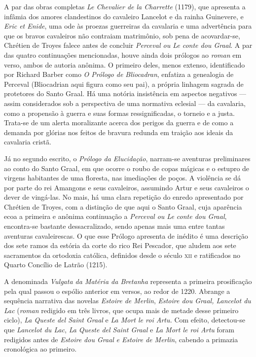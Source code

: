 A par das obras completas \textit{Le Chevalier de la Charrette} (1179),
que apresenta a infâmia dos amores clandestinos do cavaleiro Lancelot e
da rainha Guinevere, e \textit{Eric et Enide}, uma ode às proezas
guerreiras da cavalaria e uma advertência para que os bravos cavaleiros
não contraiam matrimônio, sob pena de acovardar-se, Chrétien de Troyes
falece antes de concluir \textit{Perceval ou Le conte dou Graal}. A par
das quatro continuações mencionadas, houve ainda dois prólogos ao
\textit{roman} em verso, ambos de autoria anônima. O primeiro deles,
menos extenso, identificado por Richard Barber como \textit{O Prólogo
de Bliocadran}, enfatiza a genealogia de Perceval (Bliocadrian aqui
figura como seu pai), a própria linhagem sagrada de protetores do Santo
Graal. Há uma notória insistência em aspectos negativos --- assim
considerados sob a perspectiva de uma normativa eclesial --- da
cavalaria, como a propensão à guerra e suas formas ressignificadas, o
torneio e a justa. Trata-se de um alerta moralizante acerca dos perigos
da guerra e de como a demanda por glórias nos feitos de bravura redunda
em traição aos ideais da cavalaria cristã.

Já no segundo escrito, o \textit{Prólogo da Elucidação}, narram-se
aventuras preliminares ao conto do Santo Graal, em que ocorre o roubo
de copas mágicas e o estupro de virgens habitantes de uma floresta, nas
imediações de poços. A violência se dá por parte do rei Amangons e seus
cavaleiros, assumindo Artur e seus cavaleiros o dever de vingá-las. No
mais, há uma clara repetição do enredo apresentado por Chrétien de
Troyes, com a distinção de que aqui o Santo Graal, cuja aparência ecoa
a primeira e anônima continuação a \textit{Perceval ou Le conte dou
Graal}, encontra-se bastante dessacralizado, sendo apenas mais uma
entre tantas aventuras cavaleirescas. O que esse Prólogo apresenta de
inédito é uma descrição dos sete ramos da estória da corte do rico Rei
Pescador, que aludem aos sete sacramentos da ortodoxia católica,
definidos desde o século \textsc{xii} e ratificados no Quarto Concílio de Latrão
(1215).

A denominada \textit{Vulgata da Matéria da Bretanha} representa a
primeira prosificação pela qual passou o espólio anterior em versos, ao
redor de 1220. Abrange a sequência narrativa das novelas
\textit{Estoire de Merlin}, \textit{Estoire dou Graal, Lancelot du Lac}
(\textit{roman} redigido em três livros, que ocupa mais de metade
desse primeiro ciclo), \textit{La Queste del Saint Graal} e \textit{La
Mort le roi Artu.} Com efeito, detectou-se que \textit{Lancelot du
Lac}, \textit{La Queste del Saint Graal} e \textit{La Mort le roi Artu}
foram redigidos antes de \textit{Estoire dou Graal} \textit{e Estoire
de Merlin}, cabendo a primazia cronológica ao primeiro. 

